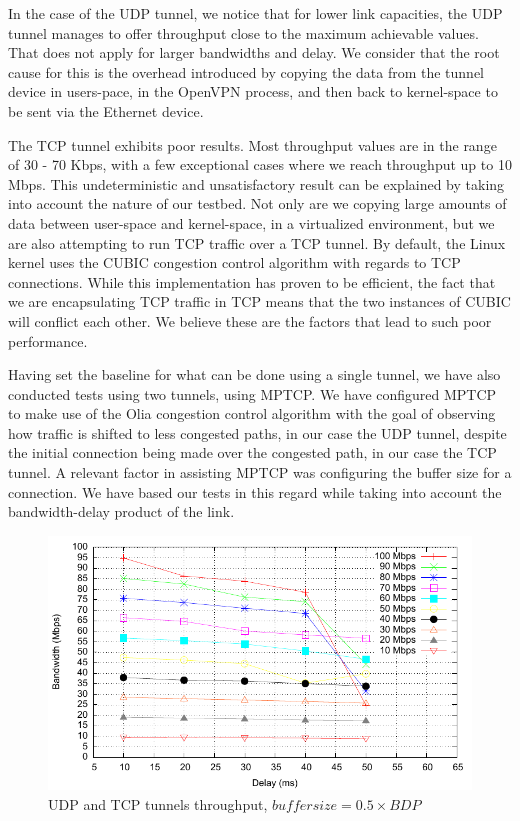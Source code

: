In the case of the UDP tunnel, we notice that for lower link capacities, the
UDP tunnel manages to offer throughput close to the maximum achievable values.
That does not apply for larger bandwidths and delay. We consider that the root
cause for this is the overhead introduced by copying the data from the tunnel
device in users-pace, in the OpenVPN process, and then back to kernel-space to
be sent via the Ethernet device.

The TCP tunnel exhibits poor results. Most throughput values are in the range
of 30 - 70 Kbps, with a few exceptional cases where we reach throughput up to
10 Mbps. This undeterministic and unsatisfactory result can be explained by
taking into account the nature of our testbed. Not only are we copying large
amounts of data between user-space and kernel-space, in a virtualized
environment, but we are also attempting to run TCP traffic over a TCP tunnel.
By default, the Linux kernel uses the CUBIC congestion control algorithm with
regards to TCP connections. While this implementation has proven to be
efficient, the fact that we are encapsulating TCP traffic in TCP means that
the two instances of CUBIC will conflict each other. We believe these are the
factors that lead to such poor performance.

Having set the baseline for what can be done using a single tunnel, we have
also conducted tests using two tunnels, using MPTCP. We have configured MPTCP
to make use of the Olia congestion control algorithm with the goal of
observing how traffic is shifted to less congested paths, in our case the UDP
tunnel, despite the initial connection being made over the congested path, in
our case the TCP tunnel. A relevant factor in assisting MPTCP was configuring
the buffer size for a connection. We have based our tests in this regard while
taking into account the bandwidth-delay product of the link.

\begin{figure}
  \centering
  \includegraphics[width=\textwidth]{img/test-mptcp-05}
  \caption{UDP and TCP tunnels throughput, $buffer size = 0.5 \times BDP$}
  \label{fig:mptcp-0.5}
\end{figure}


